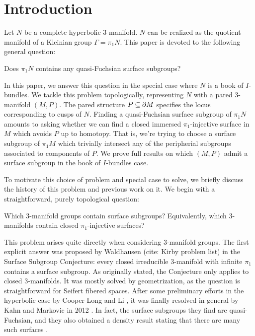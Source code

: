\section{Introduction}

Let $N$ be a complete hyperbolic 3-manifold. $N$ can be realized as the
quotient manifold of a Kleinian group $\Gamma=\pi_1N$. This paper is devoted to
the following general question:

\begin{prob}

Does $\pi_1N$ contains any quasi-Fuchsian surface subgroups?

\end{prob}

In this paper, we answer this question in the special case where $N$ is a book
of $I$-bundles. We tackle this problem topologically, representing $N$ with
a pared 3-manifold $(M,P)$.  The pared structure $P\subseteq\partial M$ specifies the
locus corresponding to cusps of $N$. Finding a quasi-Fuchsian surface subgroup
of $\pi_1N$ amounts to asking whether we can find a closed immersed
$\pi_1$-injective surface in $M$ which avoids $P$ up to homotopy.  That is,
we're trying to choose a surface subgroup of $\pi_1M$ which trivially intersect
any of the peripherial subgroups associated to components of $P$. We prove full
results on which $(M,P)$ admit a surface subgroup in the book of $I$-bundles
case.

To motivate this choice of problem and special case to solve, we briefly
discuss the history of this problem and previous work on it. We begin with
a straightforward, purely topological question:

\begin{prob}

Which 3-manifold groups contain surface subgroups? Equivalently, which
3-manifolds contain closed $\pi_1$-injective surfaces?

\end{prob}

This problem arises quite directly when considering 3-manifold groups. The
first explicit answer was proposed by Waldhausen (cite: Kirby problem list) in
the Surface Subgroup Conjecture: every closed irreducible 3-manifold with
infinite $\pi_1$ contains a surface subgroup. As originally stated, the
Conjecture only applies to closed 3-manifolds. It was mostly solved by
geometrization, as the question is straightforward for Seifert fibered spaces.
After some preliminary efforts in the hyperbolic case by Cooper-Long
\cite{CooperLong} and Li \cite{Li}, it was finally
resolved in general by Kahn and Markovic in 2012 \cite{KM}.  In fact, the
surface subgroups they find are quasi-Fuchsian, and they also obtained
a density result stating that there are many such surfaces \cite{KM2}.

